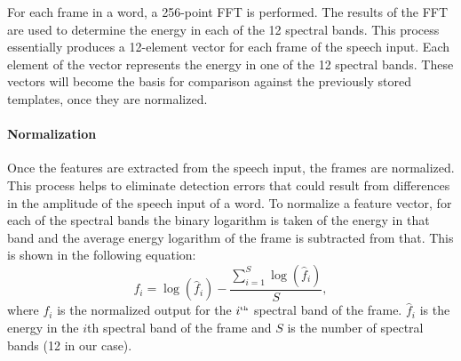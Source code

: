 
For each frame in a word, a 256-point FFT is performed. The results of the FFT are used to determine the energy in each of the 12 spectral bands. This process essentially produces a 12-element vector for each frame of the speech input. Each element of the vector represents the energy in one of the 12 spectral bands. These vectors will become the basis for comparison against the previously stored templates, once they are normalized.



\paragraph{Normalization}
Once the features are extracted from the speech input, the frames are normalized. This process helps to eliminate detection errors that could result from differences in the amplitude of the speech input of a word. To normalize a feature vector, for each of the spectral bands the binary logarithm is taken of the energy in that band and the average energy logarithm of the frame is subtracted from that. This is shown in the following equation:
\begin{equation}
    f_i = \log(\hat{f}_i) - \frac{\sum\limits^S_{i=1}\log(\hat{f}_i)}{S},
\end{equation}
where $f_i$ is the normalized output for the $i^{\text{\tiny th}}$ spectral band of the frame. $\hat{f}_i$ is the energy in the $i$th spectral band of the frame and $S$ is the number of spectral bands (12 in our case).


